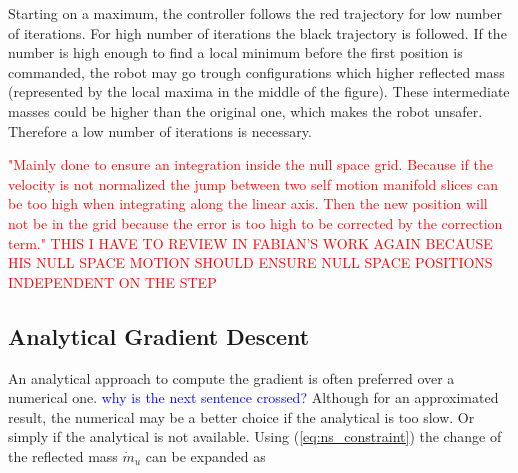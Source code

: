 

Starting on a maximum, the controller  follows the red trajectory for low number of iterations. For high number of iterations the black trajectory is followed. If the number is high enough to find a local minimum before the first position is commanded, the robot may go trough configurations which higher reflected mass (represented by the local maxima in the middle of the figure). These intermediate masses could be higher than the original one, which makes the robot unsafer. Therefore a low number of iterations is necessary.







\textcolor{red}{"Mainly done to ensure an integration inside the null space grid. Because if the velocity is not normalized the jump between two self motion manifold slices can be too high when integrating along the linear axis. Then the new position will not be in the grid because the error is too high to be corrected by the correction term." THIS I HAVE TO REVIEW IN FABIAN'S WORK AGAIN BECAUSE HIS NULL SPACE MOTION SHOULD ENSURE NULL SPACE POSITIONS INDEPENDENT ON THE STEP}













\label{subsec:2Dminim}




\subsection{Analytical Gradient Descent}
\label{sec:analytical}

An analytical approach to compute the gradient is often preferred over a numerical one. \textcolor{blue}{why is the next sentence crossed?} Although for an approximated result, the numerical may be a better choice if the analytical is too slow. Or simply if the analytical is not available.
Using (\ref{eq:ns_constraint}) the change of the reflected mass ${\dot{m}_u}$ can be expanded as

